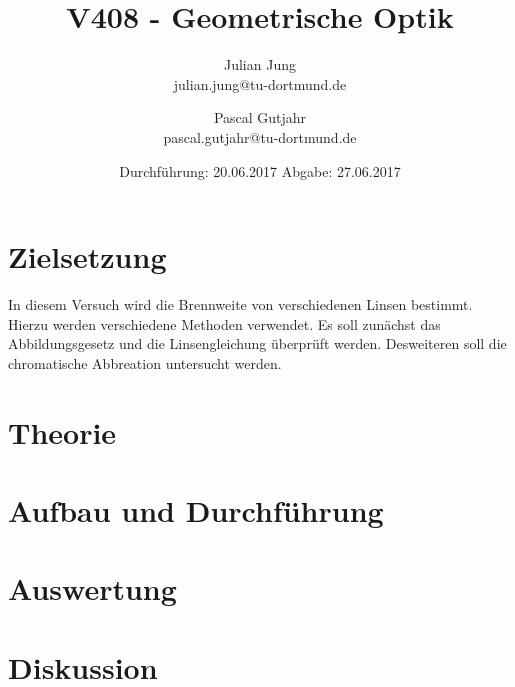 

\title{V408 - Geometrische Optik}
\author{Julian Jung \\ julian.jung@tu-dortmund.de
  \and Pascal Gutjahr \\ pascal.gutjahr@tu-dortmund.de}
  \date{Durchführung: 20.06.2017
  \hspace{3em}
  Abgabe: 27.06.2017}
  
\maketitle
\newpage
\tableofcontents
\newpage
\section{Zielsetzung}
In diesem Versuch wird die Brennweite von verschiedenen Linsen bestimmt. Hierzu
werden verschiedene Methoden verwendet.
Es soll zunächst das Abbildungsgesetz und die Linsengleichung überprüft werden.
Desweiteren soll die chromatische Abbreation untersucht werden.
\section{Theorie}
\section{Aufbau und Durchführung}
\section{Auswertung}
\section{Diskussion}
% 
\printbibliography

